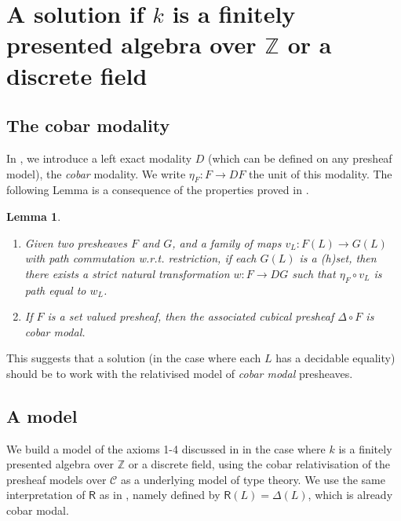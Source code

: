 \documentclass[10pt,a4paper]{article}
\newtheorem{lemma}[theorem]{Lemma}
\theoremstyle{definition}
\theoremstyle{remark}
\newcommand{\ints}{\mathbb{Z}}
\newcommand{\CC}{\mathcal{C}}
\newcommand\RR{\mathsf{R}}
\begin{document}
\section{A solution if $k$ is a finitely presented algebra over $\ints$ or a discrete field}

\subsection{The cobar modality}

In \cite{CRS21}, we introduce a left exact modality \cite{modalities}
$D$ (which can be defined on any presheaf model), the {\em cobar} modality. We write $\eta_F:F \rightarrow DF$
the unit of this modality. The following Lemma is a consequence of the properties proved in \cite{CRS21}.

\begin{lemma}
  \begin{enumerate}
   \item Given two presheaves $F$ and $G$, and a family of maps $v_L:F(L)\rightarrow G(L)$ with {\em path} commutation w.r.t. restriction, {\em if} each $G(L)$
is a (h)set, then there exists a {\em strict} natural transformation $w:F\rightarrow DG$ such that $\eta_F\circ v_L$ is path equal to $w_L$.
    \item If $F$ is a set valued presheaf, then the associated cubical presheaf $\Delta \circ F$ is cobar modal.
  \end{enumerate}
\end{lemma}

This suggests that a solution (in the case where each $L$ has a decidable equality) should be to work with the relativised model of
{\em cobar modal} presheaves.

\subsection{A model}

We build a model of the axioms 1-4 discussed in \cite{draft} in the case where $k$
is a finitely presented algebra over $\ints$ or a discrete field, using the cobar relativisation of the presheaf models over $\CC$
as a underlying model of type theory.
We use the same interpretation of $\RR$ as in \cite{draft}, namely defined by $\RR(L) = \Delta(L)$, which is already cobar modal.
\end{document}
